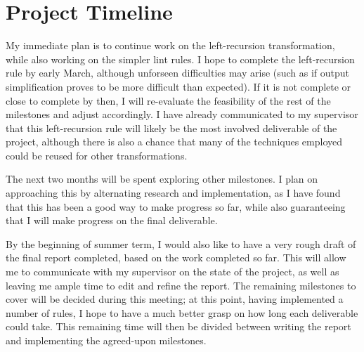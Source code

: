 \documentclass[../../main.tex]{subfiles}
\begin{document}
\section{Project Timeline}

My immediate plan is to continue work on the left-recursion transformation, while also working on the simpler lint rules.
I hope to complete the left-recursion rule by early March, although unforseen difficulties may arise (such as if output simplification proves to be more difficult than expected).
If it is not complete or close to complete by then, I will re-evaluate the feasibility of the rest of the milestones and adjust accordingly.
I have already communicated to my supervisor that this left-recursion rule will likely be the most involved deliverable of the project, although there is also a chance that many of the techniques employed could be reused for other transformations.

The next two months will be spent exploring other milestones.
I plan on approaching this by alternating research and implementation, as I have found that this has been a good way to make progress so far, while also guaranteeing that I will make progress on the final deliverable.

By the beginning of summer term, I would also like to have a very rough draft of the final report completed, based on the work completed so far.
This will allow me to communicate with my supervisor on the state of the project, as well as leaving me ample time to edit and refine the report.
The remaining milestones to cover will be decided during this meeting; at this point, having implemented a number of rules, I hope to have a much better grasp on how long each deliverable could take.
This remaining time will then be divided between writing the report and implementing the agreed-upon milestones.
\end{document}
